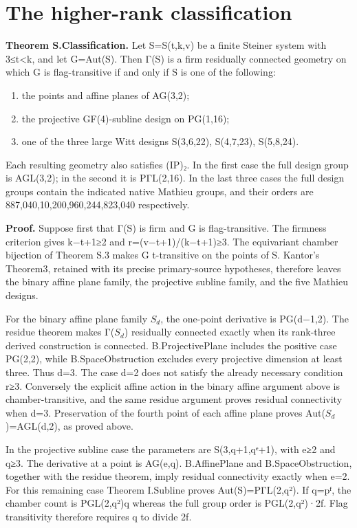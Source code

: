 \section{The higher-rank classification}
\textbf{Theorem S.Classification.} Let S=S(t,k,v) be a finite Steiner
system with 3≤t\textless k, and let G=Aut(S). Then Γ(S) is a firm
residually connected geometry on which G is flag-transitive if and only
if S is one of the following:

\begin{enumerate}
\def\labelenumi{\arabic{enumi}.}
\tightlist
\item
  the points and affine planes of AG(3,2);
\item
  the projective GF(4)-subline design on PG(1,16);
\item
  one of the three large Witt designs S(3,6,22), S(4,7,23), S(5,8,24).
\end{enumerate}

Each resulting geometry also satisfies (IP)₂. In the first case the full
design group is AGL(3,2); in the second it is PΓL(2,16). In the last
three cases the full design groups contain the indicated native Mathieu
groups, and their orders are 887,040,10,200,960,244,823,040 respectively.

\textbf{Proof.} Suppose first that Γ(S) is firm and G is
flag-transitive. The firmness criterion gives k−t+1≥2 and
r=(v−t+1)/(k−t+1)≥3. The equivariant chamber bijection of Theorem S.3 makes
G t-transitive on the points of S. Kantor's Theorem3, retained with its
precise primary-source hypotheses, therefore leaves the binary affine
plane family, the projective subline family, and the five Mathieu
designs.

For the binary affine plane family \(S_d\), the one-point derivative is
PG(d−1,2). The residue theorem makes Γ(\(S_d\)) residually connected
exactly when its rank-three derived construction is connected.
B.ProjectivePlane includes the positive case PG(2,2), while
B.SpaceObstruction excludes every projective dimension at least three.
Thus d=3. The case d=2 does not satisfy the already necessary condition
r≥3. Conversely the explicit affine action in the binary affine argument
above is chamber-transitive, and the same residue argument proves
residual connectivity when d=3. Preservation of the fourth point of each
affine plane proves Aut(\(S_d\))=AGL(d,2), as proved above.

In the projective subline case the parameters are S(3,q+1,qᵉ+1), with
e≥2 and q≥3. The derivative at a point is AG(e,q). B.AffinePlane and
B.SpaceObstruction, together with the residue theorem, imply residual
connectivity exactly when e=2. For this remaining case Theorem I.Subline
proves Aut(S)=PΓL(2,q²). If q=pᶠ, the chamber count is
\textbar PGL(2,q²)\textbar q whereas the full group order is
\textbar PGL(2,q²)\textbar·2f. Flag transitivity therefore requires q to
divide 2f.

